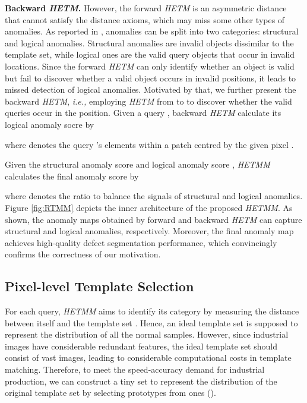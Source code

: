 \documentclass[default,iicol]{sn-jnl}\usepackage[algo2e,ruled,linesnumbered]{algorithm2e}
\theoremstyle{thmstyleone}\newtheorem{theorem}{Theorem}\newtheorem{proposition}[theorem]{Proposition}
\theoremstyle{thmstyletwo}\newtheorem{example}{Example}\newtheorem{remark}{Remark}
\theoremstyle{thmstylethree}\newtheorem{definition}{Definition}
\begin{document}
\noindent\textbf{Backward \textit{HETM}. }However, the forward \textit{HETM} is an asymmetric distance that cannot satisfy the distance axioms, which may miss some other types of anomalies.
As reported in \cite{MVTECLOCO}, anomalies can be split into two categories: structural and logical anomalies.
Structural anomalies are invalid objects dissimilar to the template set, while logical ones are the valid query objects that occur in invalid locations.
Since the forward \textit{HETM} can only identify whether an object is valid but fail to discover whether a valid object occurs in invalid positions, it leads to missed detection of logical anomalies.
Motivated by that, we further present the backward \textit{HETM}, \emph{i.e.,} employing \textit{HETM} from  to  to discover whether the valid queries occur in the position.
Given a query , backward \textit{HETM} calculate its logical anomaly socre by

where  denotes the query 's elements within a  patch centred by the given pixel .

Given the structural anomaly score  and logical anomaly score , \textit{HETMM} calculates the final anomaly score by

where  denotes the ratio to balance the signals of structural and logical anomalies.
Figure \ref{fig:RTMM} depicts the inner architecture of the proposed \textit{HETMM}.
As shown, the anomaly maps obtained by forward and backward \textit{HETM} can capture structural and logical anomalies, respectively.
Moreover, the final anomaly map achieves high-quality defect segmentation performance, which convincingly confirms the correctness of our motivation.

\subsection{Pixel-level Template Selection}
For each query, \textit{HETMM} aims to identify its category by measuring the distance between itself and the template set .
Hence, an ideal template set is supposed to represent the distribution of all the normal samples.
However, since industrial images have considerable redundant features, the ideal template set should consist of vast images, leading to considerable computational costs in template matching.
Therefore, to meet the speed-accuracy demand for industrial production, we can construct a tiny set  to represent the distribution of the original template set  by selecting  prototypes from  ones ().
\end{document}
